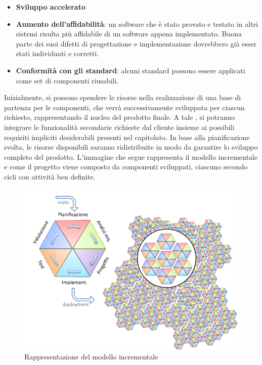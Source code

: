 \begin{itemize}
\begin{itemize}
			\item \textbf{Sviluppo accelerato}
			\item \textbf{Aumento dell'affidabilità}: un software che è stato provato e testato in altri sistemi risulta più affidabile di un software appena implementato.
			Buona parte dei suoi difetti di progettazione e implementazione dovrebbero già esser stati individuati e corretti.
			\item \textbf{Conformità con gli standard}: alcuni standard
			possono essere applicati come set di componenti riusabili.
		\end{itemize}
	\end{itemize}
	Inizialmente, si possono spendere le risorse nella realizzazione di una base di partenza per le componenti, che verrà successivamente sviluppata per ciascun  richiesto, rappresentando il nucleo del prodotto finale.
	A tale , si potranno integrare le funzionalità secondarie richieste dal cliente insieme ai possibili requisiti impliciti desiderabili presenti nel capitolato. In base alla pianificazione svolta, le risorse disponibili saranno ridistribuite in modo da garantire lo sviluppo completo del prodotto.
	L'immagine che segue rappresenta il modello incrementale e come il progetto viene composto da componenti sviluppati, ciascuno secondo cicli con attività ben definite.
	\begin{figure}[H]
		\centering
		\includegraphics[scale=0.5]{img/modello_incrementale.png}
		\caption{Rappresentazione del modello incrementale\protect\footnotemark}
		\label{fig:modello_incrementale}
	\end{figure}

